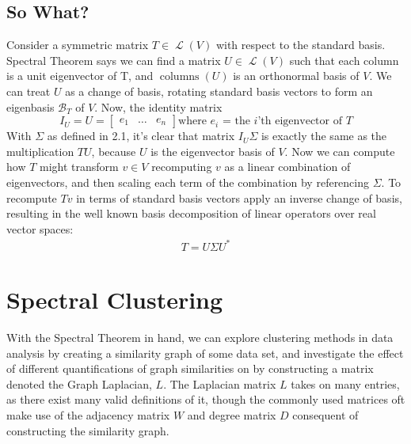 \documentclass[letterpaper,12pt]{article}
\newcommand{\linearoperator}[1]{\operatorname{\mathcal{L}}(#1)}
\begin{document}
\subsection*{So What?}
Consider a symmetric matrix $T \in \linearoperator{V}$ with respect to the standard basis. Spectral Theorem says we can find a matrix $U \in \linearoperator{V}$ such that each column is a unit eigenvector of T, and $\operatorname{columns}(U)$ is an orthonormal basis of $V$. We can treat $U$ as a change of basis, rotating standard basis vectors to form an eigenbasis $\mathcal{B}_{T}$ of $V$. Now, the identity matrix
\[
I_U = U=
\begin{bmatrix}
e_1 & \dots & e_n
\end{bmatrix}
\text{where $e_i$ = the $i$'th eigenvector of $T$}
\]
With $\Sigma$ as defined in 2.1, it's clear that matrix $I_U \Sigma$ is exactly the same as the multiplication $TU$, because $U$ is the eigenvector basis of $V$. Now we can compute how $T$ might transform $v \in V$ recomputing $v$ as a linear combination of eigenvectors, and then scaling each term of the combination by referencing $\Sigma$. To recompute $Tv$ in terms of standard basis vectors apply an inverse change of basis, resulting in the well known basis decomposition of linear operators over real vector spaces:
\begin{align}
    T = U\Sigma U^{*}
\end{align}

\section{Spectral Clustering}
With the Spectral Theorem in hand, we can explore clustering methods in data analysis by creating a similarity graph of some data set, and investigate the effect of different quantifications of graph similarities on by constructing a matrix denoted the Graph Laplacian, $L$. The Laplacian matrix $L$ takes on many entries, as there exist many valid definitions of it, though the commonly used matrices oft make use of the adjacency matrix $W$ and degree matrix $D$ consequent of constructing the similarity graph.
\end{document}
